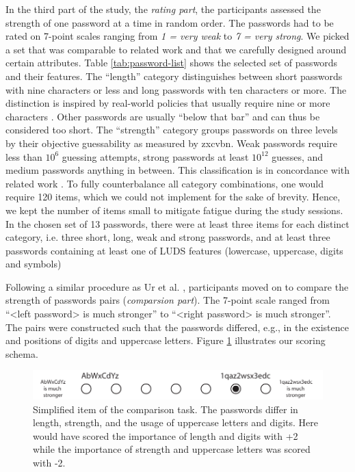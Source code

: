 In the third part of the study, the \textit{rating part}, the participants assessed the strength of one password at a time in random order. The passwords had to be rated on 7-point scales ranging from \textit{1 = very weak} to \textit{7 = very strong}. We picked a set that was comparable to related work \cite{Ur2016PerceptionsPassword} and that we carefully designed around certain attributes. Table \ref{tab:password-list} shows the selected set of passwords and their features. The ``length'' category distinguishes between short passwords with nine characters or less and long passwords with ten characters or more. The distinction is inspired by real-world policies that usually require nine or more characters \cite{Wang2015EmperorsPolicies}. Other passwords are usually ``below that bar'' and can thus be considered too short. The ``strength'' category groups passwords on three levels by their objective guessability as measured by zxcvbn. Weak passwords require less than $10^{6}$ guessing attempts, strong passwords at least $10^{12}$ guesses, and medium passwords anything in between. This classification is in concordance with related work \cite{Florencio2014AdministratorsGuide, Wheeler2016zxcvbn} . To fully counterbalance all category combinations, one would require 120 items, which we could not implement for the sake of brevity. Hence, we kept the number of items small to mitigate fatigue during the study sessions. In the chosen set of 13 passwords, there were at least three items for each distinct category, i.e. three short, long, weak and strong passwords, and at least three passwords containing at least one of LUDS features (lowercase, uppercase, digits and symbols)

Following a similar procedure as Ur et al. \cite{Ur2016PerceptionsPassword}, participants moved on to compare the strength of passwords pairs (\textit{comparsion part}). The 7-point scale ranged from ``<left password> is much stronger'' to ``<right password> is much stronger''. The pairs were constructed such that the passwords differed, e.g., in the existence and positions of digits and uppercase letters. Figure \ref{fig:comparisontask} illustrates our scoring schema. 

\begin{figure}
	\centering
	\includegraphics[width=\linewidth]{figures/comparisontask}
	\caption{\label{fig:comparisontask} Simplified item of the comparison task. The passwords differ in length, strength, and the usage of uppercase letters and digits. Here would have scored the importance of length and digits with +2 while the importance of strength and uppercase letters was scored with -2.}
\end{figure}

